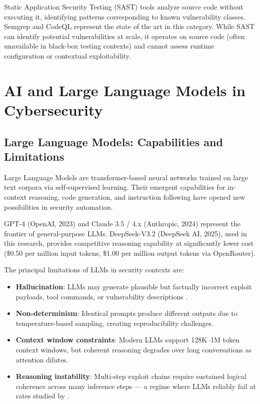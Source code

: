 \documentclass[12pt,a4paper,oneside,openany]{book}
\begin{document}
Static Application Security Testing (SAST) tools analyze source code without executing it, identifying patterns corresponding to known vulnerability classes. Semgrep and CodeQL represent the state of the art in this category. While SAST can identify potential vulnerabilities at scale, it operates on source code (often unavailable in black-box testing contexts) and cannot assess runtime configuration or contextual exploitability.

\section{AI and Large Language Models in Cybersecurity}

\subsection{Large Language Models: Capabilities and Limitations}

Large Language Models are transformer-based neural networks \cite{vaswani2017attention} trained on large text corpora via self-supervised learning. Their emergent capabilities for in-context reasoning, code generation, and instruction following have opened new possibilities in security automation.

GPT-4 (OpenAI, 2023) and Claude 3.5 / 4.x (Anthropic, 2024) represent the frontier of general-purpose LLMs. DeepSeek-V3.2 (DeepSeek AI, 2025), used in this research, provides competitive reasoning capability at significantly lower cost (\$0.50 per million input tokens, \$1.00 per million output tokens via OpenRouter).

The principal limitations of LLMs in security contexts are:

\begin{warningbox}
\begin{itemize}
\item \textbf{Hallucination}: LLMs may generate plausible but factually incorrect exploit payloads, tool commands, or vulnerability descriptions \cite{ji2023survey}.
\item \textbf{Non-determinism}: Identical prompts produce different outputs due to temperature-based sampling, creating reproducibility challenges.
\item \textbf{Context window constraints}: Modern LLMs support 128K--1M token context windows, but coherent reasoning degrades over long conversations as attention dilutes.
\item \textbf{Reasoning instability}: Multi-step exploit chains require sustained logical coherence across many inference steps — a regime where LLMs reliably fail at rates studied by \cite{zhou2024llm}.
\end{itemize}
\end{warningbox}
\end{document}
